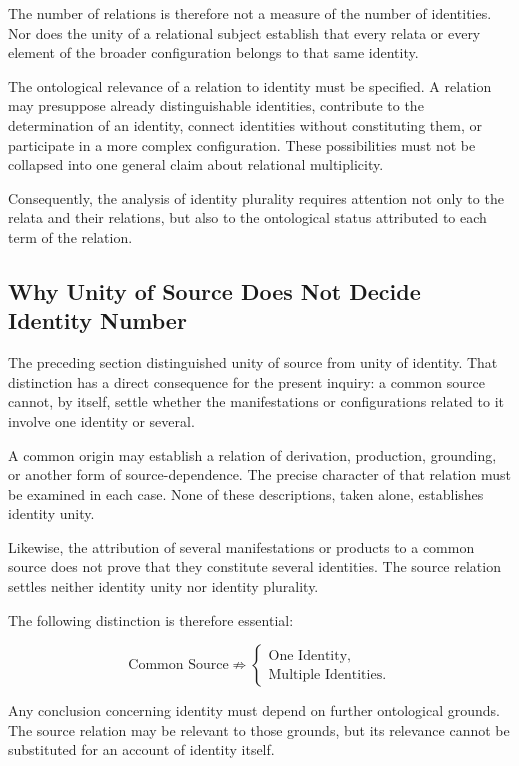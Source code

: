 The number of relations is therefore not a measure of the
number of identities. Nor does the unity of a relational
subject establish that every relata or every element of
the broader configuration belongs to that same identity.

The ontological relevance of a relation to identity must
be specified. A relation may presuppose already distinguishable
identities, contribute to the determination of an identity,
connect identities without constituting them, or participate
in a more complex configuration. These possibilities must
not be collapsed into one general claim about relational
multiplicity.

Consequently, the analysis of identity plurality requires
attention not only to the relata and their relations, but
also to the ontological status attributed to each term
of the relation.

\subsection{Why Unity of Source Does Not Decide Identity Number}

The preceding section distinguished unity of source from
unity of identity. That distinction has a direct consequence
for the present inquiry: a common source cannot, by itself,
settle whether the manifestations or configurations related
to it involve one identity or several.

A common origin may establish a relation of derivation,
production, grounding, or another form of source-dependence.
The precise character of that relation must be examined
in each case. None of these descriptions, taken alone,
establishes identity unity.

Likewise, the attribution of several manifestations or
products to a common source does not prove that they
constitute several identities. The source relation settles
neither identity unity nor identity plurality.

The following distinction is therefore essential:

\[
\text{Common Source}
\not\Rightarrow
\begin{cases}
\text{One Identity},\\
\text{Multiple Identities}.
\end{cases}
\]

Any conclusion concerning identity must depend on further
ontological grounds. The source relation may be relevant
to those grounds, but its relevance cannot be substituted
for an account of identity itself.

